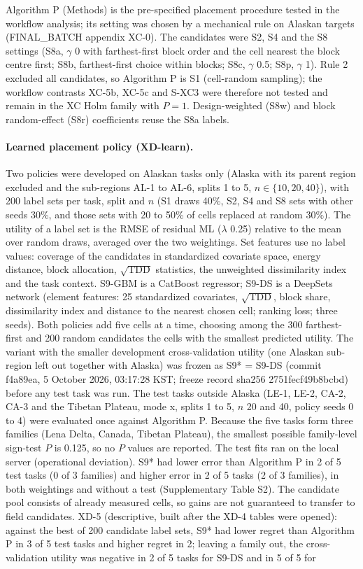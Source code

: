 Algorithm P (Methods) is the pre-specified placement procedure tested in the workflow analysis; its setting was chosen by a mechanical rule on Alaskan targets (FINAL\_BATCH appendix XC-0). The candidates were S2, S4 and the S8 settings (S8a, $\gamma$ 0 with farthest-first block order and the cell nearest the block centre first; S8b, farthest-first choice within blocks; S8c, $\gamma$ 0.5; S8p, $\gamma$ 1). Rule 2 excluded all candidates, so Algorithm P is S1 (cell-random sampling); the workflow contrasts XC-5b, XC-5c and S-XC3 were therefore not tested and remain in the XC Holm family with $P = 1$. Design-weighted (S8w) and block random-effect (S8r) coefficients reuse the S8a labels.

\paragraph*{Learned placement policy (XD-learn).} Two policies were developed on Alaskan tasks only (Alaska with its parent region excluded and the sub-regions AL-1 to AL-6, splits 1 to 5, $n \in \{10, 20, 40\}$), with 200 label sets per task, split and $n$ (S1 draws 40\%, S2, S4 and S8 sets with other seeds 30\%, and those sets with 20 to 50\% of cells replaced at random 30\%). The utility of a label set is the RMSE of residual ML ($\lambda$ 0.25) relative to the mean over random draws, averaged over the two weightings. Set features use no label values: coverage of the candidates in standardized covariate space, energy distance, block allocation, $\sqrt{\mathrm{TDD}}$ statistics, the unweighted dissimilarity index and the task context. S9-GBM is a CatBoost regressor; S9-DS is a DeepSets network (element features: 25 standardized covariates, $\sqrt{\mathrm{TDD}}$, block share, dissimilarity index and distance to the nearest chosen cell; ranking loss; three seeds). Both policies add five cells at a time, choosing among the 300 farthest-first and 200 random candidates the cells with the smallest predicted utility. The variant with the smaller development cross-validation utility (one Alaskan sub-region left out together with Alaska) was frozen as S9* = S9-DS (commit f4a89ea, 5 October 2026, 03:17:28 KST; freeze record sha256 2751fecf49b8bcbd) before any test task was run. The test tasks outside Alaska (LE-1, LE-2, CA-2, CA-3 and the Tibetan Plateau, mode x, splits 1 to 5, $n$ 20 and 40, policy seeds 0 to 4) were evaluated once against Algorithm P. Because the five tasks form three families (Lena Delta, Canada, Tibetan Plateau), the smallest possible family-level sign-test $P$ is 0.125, so no $P$ values are reported. The test fits ran on the local server (operational deviation). S9* had lower error than Algorithm P in 2 of 5 test tasks (0 of 3 families) and higher error in 2 of 5 tasks (2 of 3 families), in both weightings and without a test (Supplementary Table S2). The candidate pool consists of already measured cells, so gains are not guaranteed to transfer to field candidates. XD-5 (descriptive, built after the XD-4 tables were opened): against the best of 200 candidate label sets, S9* had lower regret than Algorithm P in 3 of 5 test tasks and higher regret in 2; leaving a family out, the cross-validation utility was negative in 2 of 5 tasks for S9-DS and in 5 of 5 for 